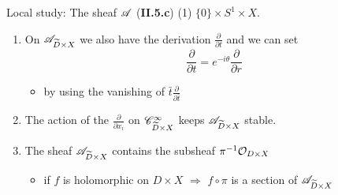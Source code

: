 \begin{frame}[t]{Local study: The sheaf $\mathscr{A}$ (\textbf{II.5.c}) (1)}
  $\{0\}\times S^1\times X$.
  \begin{enumerate}
    \item On $\mathscr{A}_{\widetilde D\times X}$ we also have the derivation
      $\frac{\partial}{\partial t}$ and we can set
      \[
        \frac{\partial}{\partial t}=e^{-i\theta}\frac{\partial}{\partial r}
      \]
      \begin{itemize}
        \item by using the vanishing of $\bar t\frac{\partial}{\partial\bar t}$
      \end{itemize}
    \item The action of the $\frac{\partial}{\partial x_i}$ on
      $\mathscr{C}_{\widetilde D\times X}^\infty$ keeps $\mathscr{A}_{\widetilde D\times X}$ stable.
    \item The sheaf $\mathscr{A}_{\widetilde D\times X}$ contains the subsheaf
      $\pi^{-1}\mathcal{O}_{D\times X}$
      \begin{itemize}
        \item if $f$ is holomorphic on $D\times X$ $\Rightarrow$ $f\circ\pi$ is
          a section of $\mathscr{A}_{\widetilde D\times X}$
      \end{itemize}
  \end{enumerate}
\end{frame}

